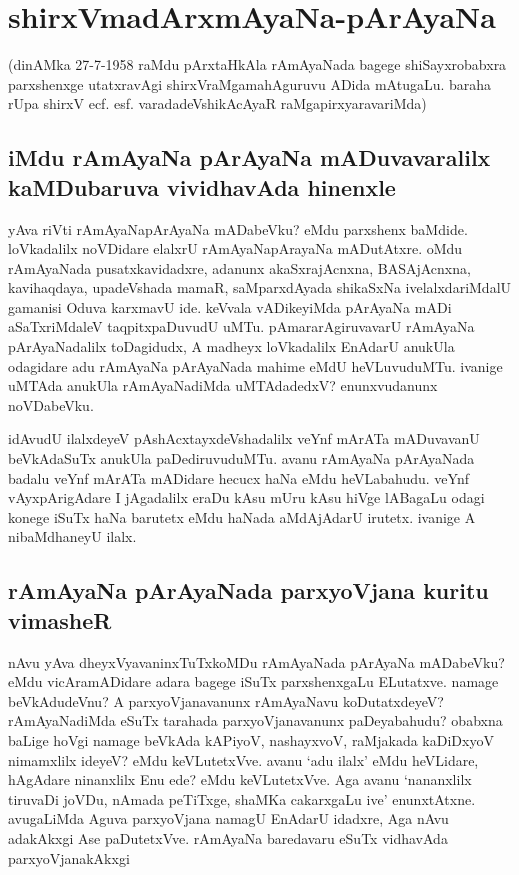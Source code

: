 \chapter{shirxVmadArxmAyaNa-pArAyaNa} 

(dinAMka 27-7-1958 raMdu pArxtaHkAla rAmAyaNada bagege shiSayxrobabxra parxshenxge utatxravAgi shirxVraMgamahAguruvu ADida mAtugaLu. baraha rUpa shirxV ecf. esf. varadadeVshikAcAyaR raMgapirxyaravariMda) 

\section*{iMdu rAmAyaNa pArAyaNa mADuvavaralilx kaMDubaruva vividhavAda hinenxle} 

yAva riVti rAmAyaNapArAyaNa mADabeVku? eMdu parxshenx baMdide. loVkadalilx noVDidare elalxrU rAmAyaNapArayaNa mADutAtxre. oMdu rAmAyaNada pusatxkavidadxre, adanunx akaSxrajAcnxna, BASAjAcnxna, kavihaqdaya, upadeVshada mamaR, saMparxdAyada shikaSxNa ivelalxdariMdalU gamanisi Oduva karxmavU ide. keVvala vADikeyiMda pArAyaNa mADi aSaTxriMdaleV taqpitxpaDuvudU uMTu. pAmararAgiruvavarU rAmAyaNa pArAyaNadalilx toDagidudx, A madheyx loVkadalilx EnAdarU anukUla odagidare adu rAmAyaNa pArAyaNada mahime eMdU heVLuvuduMTu. ivanige uMTAda anukUla rAmAyaNadiMda uMTAdadedxV? enunxvudanunx noVDabeVku. 

idAvudU ilalxdeyeV pAshAcxtayxdeVshadalilx veYnf mArATa mADuvavanU beVkAdaSuTx anukUla paDediruvuduMTu. avanu rAmAyaNa pArAyaNada badalu veYnf mArATa mADidare hecucx haNa eMdu heVLabahudu. veYnf vAyxpArigAdare I jAgadalilx eraDu kAsu mUru kAsu hiVge lABagaLu odagi konege iSuTx haNa barutetx eMdu haNada aMdAjAdarU irutetx. ivanige A nibaMdhaneyU ilalx. 

\section*{rAmAyaNa pArAyaNada parxyoVjana kuritu vimasheR} 

nAvu yAva dheyxVyavaninxTuTxkoMDu rAmAyaNada pArAyaNa mADabeVku? eMdu vicAramADidare adara bagege iSuTx parxshenxgaLu ELutatxve. namage beVkAdudeVnu? A parxyoVjanavanunx rAmAyaNavu koDutatxdeyeV? rAmAyaNadiMda eSuTx tarahada parxyoVjanavanunx paDeyabahudu? obabxna baLige hoVgi namage beVkAda kAPiyoV, nashayxvoV, raMjakada kaDiDxyoV nimamxlilx ideyeV? eMdu keVLutetxVve. avanu `adu ilalx' eMdu heVLidare, hAgAdare ninanxlilx Enu ede? eMdu keVLutetxVve. Aga avanu `nananxlilx tiruvaDi joVDu, nAmada peTiTxge, shaMKa cakarxgaLu ive' enunxtAtxne. avugaLiMda Aguva parxyoVjana namagU EnAdarU idadxre, Aga nAvu adakAkxgi Ase paDutetxVve. rAmAyaNa baredavaru eSuTx vidhavAda parxyoVjanakAkxgi 


